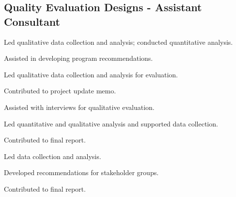 \subsection{Quality Evaluation Designs - Assistant Consultant}
\begin{cvtable}
        {\color{cvsectioncolor}{Penn State Acoustics Program}}
        {}
        {\begin{tightitemize}
            \item Led qualitative data collection and analysis; conducted quantitative analysis.
            \item Assisted in developing program recommendations.
        \end{tightitemize}}
        {\color{cvsectioncolor}{RIEF - Virtual Community of Practice}}
        {}
        {\begin{tightitemize}
            \item Led qualitative data collection and analysis for evaluation.
            \item Contributed to project update memo.
        \end{tightitemize}}
    \cvitem{}
        {\color{cvsectioncolor}{IGE - Personalized Learning Module for Graduate STEM Education}}
        {}
        {\begin{tightitemize}
            \item Assisted with interviews for qualitative evaluation.
        \end{tightitemize}}  
        {\color{cvsectioncolor}{Engineering Education and Research Centers}}
        {}
        {\begin{tightitemize}
            \item Led quantitative and qualitative analysis and supported data collection.
            \item Contributed to final report.
        \end{tightitemize}}
    \cvitem{}
        {\color{cvsectioncolor}{Capacity Building for Research at Minority Serving Institutions}}
        {}
        {\begin{tightitemize}
            \item Led data collection and analysis.
            \item Developed recommendations for stakeholder groups.
            \item Contributed to final report.
        \end{tightitemize}}
\end{cvtable}